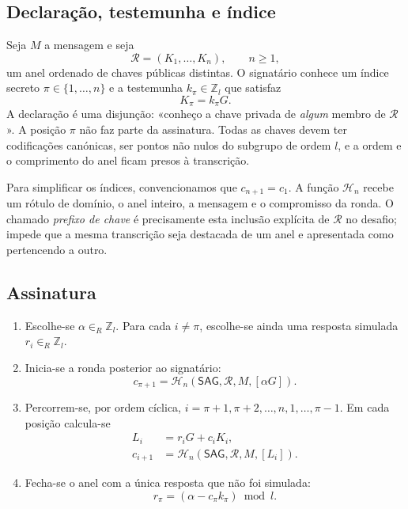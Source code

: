 \subsection*{Declaração, testemunha e índice}

Seja \(M\) a mensagem e seja
\[
\mathcal R=(K_1,\ldots,K_n),\qquad n\geq1,
\]
um anel ordenado de chaves públicas distintas. O signatário conhece um índice
secreto \(\pi\in\{1,\ldots,n\}\) e a testemunha
\(k_\pi\in\mathbb Z_l\) que satisfaz
\[
K_\pi=k_\pi G.
\]
A declaração é uma disjunção: «conheço a chave privada de \emph{algum}
membro de \(\mathcal R\)». A posição \(\pi\) não faz parte da assinatura.
Todas as chaves devem ter codificações canónicas, ser pontos não nulos do
subgrupo de ordem \(l\), e a ordem e o comprimento do anel ficam presos à
transcrição.

Para simplificar os índices, convencionamos que \(c_{n+1}=c_1\). A função
\(\mathcal H_n\) recebe um rótulo de domínio, o anel inteiro, a mensagem e o
compromisso da ronda. O chamado \emph{prefixo de chave} é precisamente esta
inclusão explícita de \(\mathcal R\) no desafio; impede que a mesma
transcrição seja destacada de um anel e apresentada como pertencendo a outro.

\subsection*{Assinatura}

\begin{enumerate}
    \item Escolhe-se \(\alpha\in_R\mathbb Z_l\). Para cada
    \(i\neq\pi\), escolhe-se ainda uma resposta simulada
    \(r_i\in_R\mathbb Z_l\).

    \item Inicia-se a ronda posterior ao signatário:
    \[
    c_{\pi+1}
      =\mathcal H_n(\mathsf{SAG},\mathcal R,M,[\alpha G]).
    \]

    \item Percorrem-se, por ordem cíclica,
    \(i=\pi+1,\pi+2,\ldots,n,1,\ldots,\pi-1\). Em cada posição calcula-se
    \begin{align*}
    L_i&=r_iG+c_iK_i,\\
    c_{i+1}
      &=\mathcal H_n(\mathsf{SAG},\mathcal R,M,[L_i]).
    \end{align*}

    \item Fecha-se o anel com a única resposta que não foi simulada:
    \[
    r_\pi=(\alpha-c_\pi k_\pi)\bmod l.
    \]
\end{enumerate}

